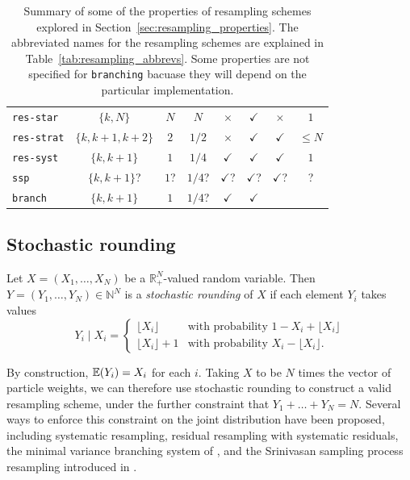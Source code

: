\begin{landscape}
\begin{table}[ht]
\begin{tabular}{ l | c c c c c c c }
\texttt{res-star} & $\{k, N\}$ & $N$ & $N$ & $\times$ & $\checkmark$ 
        & $\times$ & $1$ \\
\texttt{res-strat} & $\{k, k+1, k+2\}$ & $2$ & $1/2$ & $\times$ & $\checkmark$ 
        & $\checkmark$ & $\leq N$ \\
\texttt{res-syst} & $\{k, k+1\}$ & $1$ & $1/4$ & $\checkmark$ & $\checkmark$ 
        & $\checkmark$ & $1$ \\
\texttt{ssp} & $\{k, k+1\}$? & $1$? & $1/4$? & $\checkmark$? & $\checkmark$? 
        & $\checkmark$? & ? \\
\texttt{branch} & $\{k, k+1\}$ & $1$ & $1/4$? & $\checkmark$ & $\checkmark$ 
        & & \\
\hline\hline
\end{tabular}
\caption[Properties of resampling schemes]{Summary of some of the properties of resampling schemes explored in Section~\ref{sec:resampling_properties}. The abbreviated names for the resampling schemes are explained in Table~\ref{tab:resampling_abbrevs}.  Some properties are not specified for \texttt{branching} bacuase they will depend on the particular implementation.}
\label{tab:resampling_properties}
\end{table} 
\end{landscape}
 
 
 

\subsection{Stochastic rounding \seb{$\checkmark$} }\label{sec:SRs}

\begin{defn}\label{defn:stochround}
 Let $X=(X_1,\dots,X_N)$ be a $\mathbb{R}_+^N$-valued random variable. Then $Y=(Y_1,\dots,Y_N) \in \mathbb{N}^N$ is a \emph{stochastic rounding} of $X$ if each element $Y_i$ takes values
\begin{equation*}
Y_i \mid X_i =
\begin{cases}
 \lfloor X_i \rfloor & \text{with probability } 1- X_i+ \lfloor X_i \rfloor \\
  \lfloor X_i \rfloor +1 & \text{with probability } X_i- \lfloor X_i \rfloor .
\end{cases}
\end{equation*}
\end{defn}

By construction, $\mathbb{E}(Y_i) = X_i$ for each $i$. Taking $X$ to be $N$ times the vector of particle weights, we can therefore use stochastic rounding to construct a valid resampling scheme, under the further constraint that $Y_1 + \dots + Y_N = N$.
Several ways to enforce this constraint on the joint distribution have been proposed, including systematic resampling, residual resampling with systematic residuals, the minimal variance branching system of \textcite{crisan1997}, and the Srinivasan sampling process resampling introduced in \textcite{gerber2017}.

